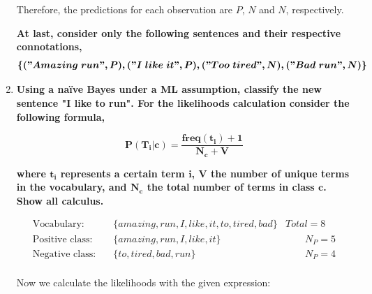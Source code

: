 \documentclass[12pt]{article}
\begin{document}
\begin{enumerate}[leftmargin=\labelsep]
    \vspace{10pt}
    Therefore, the predictions for each observation are $P$, $N$ and $N$, respectively.

    \vspace{10pt}

    \textbf{At last, consider only the following sentences and their respective connotations,}
    \[
    \boldsymbol{\{("Amazing\; run", P), ("I\; like\; it", P), ("Too\; tired", N), ("Bad\; run", N)\}}
    \]

    \item \textbf{Using a naïve Bayes under a ML assumption, classify the new sentence
    "I like to run". For the likelihoods calculation consider the following formula,}

    \begin{equation*}
        \boldsymbol{P(T_i|c) = \frac{freq(t_i) + 1}{N_c + V}}
    \end{equation*}

    \textbf{where $\mathbf{t_i}$ represents a certain term $\mathbf{i}$, $\mathbf{V}$ the number of unique terms in the vocabulary, and
    $\mathbf{N_c}$ the total number of terms in class $\mathbf{c}$. Show all calculus.}

    
    \vspace{10pt}
    \begin{equation*}
        \begin{aligned}
            \text{Vocabulary:} & \quad \{amazing, run, I, like, it, to, tired, bad\} & Total = 8\\
            \text{Positive class:} & \quad \{amazing, run, I, like, it\} &\qquad N_P = 5\\
            \text{Negative class:} & \quad \{to, tired, bad, run\} &\qquad N_P = 4\\
        \end{aligned}
    \end{equation*}

    \vspace{10pt}
    Now we calculate the likelihoods with the given expression:


\end{enumerate}
\end{document}
